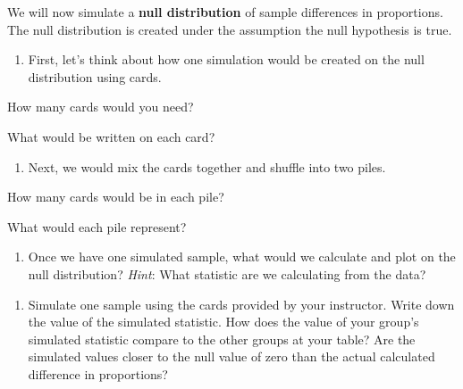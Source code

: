 \documentclass[
]{report}
\providecommand{\tightlist}{%
  \setlength{\itemsep}{0pt}\setlength{\parskip}{0pt}}
\newcommand{\rgi}{\hspace{24pt}}  %
\begin{document}
\newpage

We will now simulate a \textbf{null distribution} of sample differences in proportions. The null distribution is created under the assumption the null hypothesis is true.

\begin{enumerate}
\def\labelenumi{\arabic{enumi}.}
\setcounter{enumi}{11}
\tightlist
\item
  First, let's think about how one simulation would be created on the null distribution using cards.
\end{enumerate}

\rgi How many cards would you need?
\vspace{0.1in}

\rgi What would be written on each card?

\vspace{0.5in}

\begin{enumerate}
\def\labelenumi{\arabic{enumi}.}
\setcounter{enumi}{12}
\tightlist
\item
  Next, we would mix the cards together and shuffle into two piles.
\end{enumerate}

\rgi How many cards would be in each pile?\\
\vspace{0.1in}

\rgi What would each pile represent?
\vspace{0.5in}

\begin{enumerate}
\def\labelenumi{\arabic{enumi}.}
\setcounter{enumi}{13}
\tightlist
\item
  Once we have one simulated sample, what would we calculate and plot on the null distribution? \emph{Hint}: What statistic are we calculating from the data?
\end{enumerate}

\vspace{0.8in}

\begin{enumerate}
\def\labelenumi{\arabic{enumi}.}
\setcounter{enumi}{14}
\tightlist
\item
  Simulate one sample using the cards provided by your instructor. Write down the value of the simulated statistic. How does the value of your group's simulated statistic compare to the other groups at your table? Are the simulated values closer to the null value of zero than the actual calculated difference in proportions?
\end{enumerate}
\end{document}
